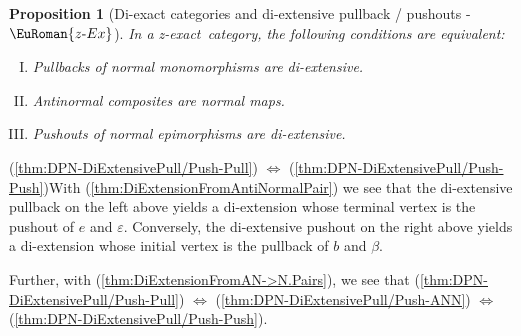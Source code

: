 \documentclass [12pt,oneside]{book}%
\makeatletter
\theoremstyle{captionstyle}  %
\newtheorem{proposition}[theorem]{Proposition}
\renewenvironment{proof}[1][\proofname]{\vspace{-2ex}\par       %
	\pushQED{\qed}%
	\normalfont \topsep6\p@\@plus6\p@\relax
	\trivlist
	\item[\hskip\labelsep
	            \color{proofcaption}\bfseries                %
	            #1\@addpunct{\quad}]\ignorespaces
}{%
	\popQED\endtrivlist\@endpefalse
}
\newenvironment{tfae}{		%
	\begin{enumerate}[(I)]}{
	\end{enumerate}
}
\newcommand{\hy}{\text{-}}													%
\newcommand{\ZExact}{z-exact}									%
\newcommand{\ZExactTag}{ - {\color{Cerulean} $\EuRoman{z\hy Ex}$}}
\makeatother
\begin{document}
\begin{proposition}[Di-exact categories and di-extensive pullback / pushouts\ZExactTag]
    \label{thm:DPN-DiExtensivePull/Push}%
    In a \ZExact\ category, the following conditions are equivalent:
    \begin{tfae}
        \item \label{thm:DPN-DiExtensivePull/Push-Pull}%
        Pullbacks of normal monomorphisms are di-extensive.
        \item \label{thm:DPN-DiExtensivePull/Push-ANN}%
        Antinormal composites are normal maps.
        \item \label{thm:DPN-DiExtensivePull/Push-Push}%
        Pushouts of normal epimorphisms are di-extensive.
    \end{tfae}
\end{proposition}
\begin{proof}
    (\ref{thm:DPN-DiExtensivePull/Push-Pull}) $\Leftrightarrow$ (\ref{thm:DPN-DiExtensivePull/Push-Push})\quad With (\ref{thm:DiExtensionFromAntiNormalPair}) we see that the di-extensive pullback on the left above yields a di-extension whose terminal vertex is the pushout of $e$ and $\varepsilon$. Conversely, the di-extensive pushout on the right above yields a di-extension whose initial vertex is the pullback of $b$ and $\beta$.

    Further, with (\ref{thm:DiExtensionFromAN->N.Pairs}), we see that (\ref{thm:DPN-DiExtensivePull/Push-Pull}) $\Leftrightarrow$  (\ref{thm:DPN-DiExtensivePull/Push-ANN}) $\Leftrightarrow$ (\ref{thm:DPN-DiExtensivePull/Push-Push}).
\end{proof}
\end{document}
